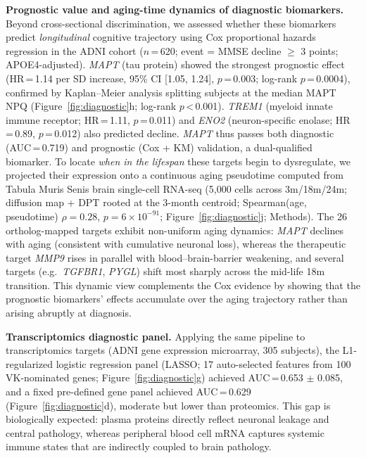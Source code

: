 \documentclass[12pt,a4paper]{article}
\begin{document}
\textbf{Prognostic value and aging-time dynamics of diagnostic biomarkers.}
Beyond cross-sectional discrimination, we assessed whether these biomarkers predict \emph{longitudinal} cognitive trajectory using Cox proportional hazards regression in the ADNI cohort ($n$\,=\,620; event = MMSE decline $\geq$ 3 points; APOE4-adjusted). \textit{MAPT} (tau protein) showed the strongest prognostic effect (HR\,=\,1.14 per SD increase, 95\% CI [1.05, 1.24], $p$\,=\,0.003; log-rank $p$\,=\,0.0004), confirmed by Kaplan--Meier analysis splitting subjects at the median MAPT NPQ (Figure~\ref{fig:diagnostic}h; log-rank $p$\,<\,0.001). \textit{TREM1} (myeloid innate immune receptor; HR\,=\,1.11, $p$\,=\,0.011) and \textit{ENO2} (neuron-specific enolase; HR\,=\,0.89, $p$\,=\,0.012) also predicted decline. \textit{MAPT} thus passes both diagnostic (AUC\,=\,0.719) and prognostic (Cox + KM) validation, a dual-qualified biomarker. To locate \emph{when in the lifespan} these targets begin to dysregulate, we projected their expression onto a continuous aging pseudotime computed from Tabula Muris Senis brain single-cell RNA-seq (5{,}000 cells across 3m/18m/24m; diffusion map + DPT rooted at the 3-month centroid; Spearman(age, pseudotime) $\rho = 0.28$, $p = 6 \times 10^{-91}$; Figure~\ref{fig:diagnostic}j; Methods). The 26 ortholog-mapped targets exhibit non-uniform aging dynamics: \textit{MAPT} declines with aging (consistent with cumulative neuronal loss), whereas the therapeutic target \textit{MMP9} rises in parallel with blood--brain-barrier weakening, and several targets (e.g.\ \textit{TGFBR1}, \textit{PYGL}) shift most sharply across the mid-life 18m transition. This dynamic view complements the Cox evidence by showing that the prognostic biomarkers' effects accumulate over the aging trajectory rather than arising abruptly at diagnosis.

\textbf{Transcriptomics diagnostic panel.}
Applying the same pipeline to transcriptomics targets (ADNI gene expression microarray, 305 subjects), the L1-regularized logistic regression panel (LASSO; 17 auto-selected features from 100 VK-nominated genes; Figure~\ref{fig:diagnostic}g) achieved AUC\,=\,0.653 $\pm$ 0.085, and a fixed pre-defined gene panel achieved AUC\,=\,0.629 (Figure~\ref{fig:diagnostic}d), moderate but lower than proteomics. This gap is biologically expected: plasma proteins directly reflect neuronal leakage and central pathology, whereas peripheral blood cell mRNA captures systemic immune states that are indirectly coupled to brain pathology.
\end{document}
